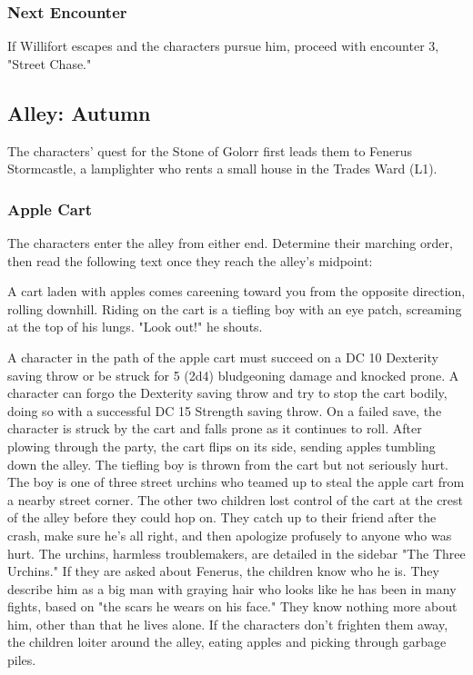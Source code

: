\documentclass[10pt,a4paper,twoside,twocolumn,openany,nodeprecatedcode]{dndbook}
\begin{document}
\subsubsection{Next Encounter}
If Willifort escapes and the characters pursue him, proceed with encounter 3, "Street Chase."
\subsection{Alley: Autumn}
The characters' quest for the Stone of Golorr first leads them to Fenerus Stormcastle, a lamplighter who rents a small house in the Trades Ward (L1).
\subsubsection{Apple Cart}
The characters enter the alley from either end. Determine their marching order, then read the following text once they reach the alley's midpoint:
\begin{DndReadAloud}{}
A cart laden with apples comes careening toward you from the opposite direction, rolling downhill. Riding on the cart is a tiefling boy with an eye patch, screaming at the top of his lungs. "Look out!" he shouts.
\end{DndReadAloud}

A character in the path of the apple cart must succeed on a DC 10 Dexterity saving throw or be struck for 5 (2d4) bludgeoning damage and knocked prone. A character can forgo the Dexterity saving throw and try to stop the cart bodily, doing so with a successful DC 15 Strength saving throw. On a failed save, the character is struck by the cart and falls prone as it continues to roll. After plowing through the party, the cart flips on its side, sending apples tumbling down the alley. The tiefling boy is thrown from the cart but not seriously hurt.
The boy is one of three street urchins who teamed up to steal the apple cart from a nearby street corner. The other two children lost control of the cart at the crest of the alley before they could hop on. They catch up to their friend after the crash, make sure he's all right, and then apologize profusely to anyone who was hurt. The urchins, harmless troublemakers, are detailed in the sidebar "The Three Urchins."
If they are asked about Fenerus, the children know who he is. They describe him as a big man with graying hair who looks like he has been in many fights, based on "the scars he wears on his face." They know nothing more about him, other than that he lives alone.
If the characters don't frighten them away, the children loiter around the alley, eating apples and picking through garbage piles.
\end{document}

